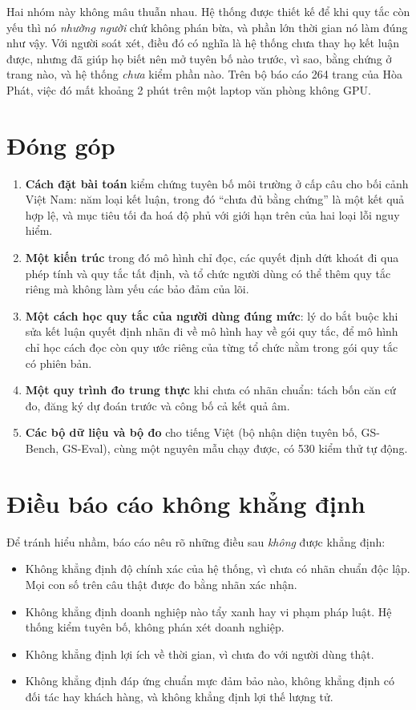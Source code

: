 Hai nhóm này không mâu thuẫn nhau. Hệ thống được thiết kế để khi quy tắc còn yếu thì nó \emph{nhường người} chứ không phán bừa, và phần lớn thời gian nó làm đúng như vậy. Với người soát xét, điều đó có nghĩa là hệ thống chưa thay họ kết luận được, nhưng đã giúp họ biết nên mở tuyên bố nào trước, vì sao, bằng chứng ở trang nào, và hệ thống \emph{chưa} kiểm phần nào. Trên bộ báo cáo 264 trang của Hòa Phát, việc đó mất khoảng 2 phút trên một laptop văn phòng không GPU.

\section{Đóng góp}

\begin{enumerate}
\item \textbf{Cách đặt bài toán} kiểm chứng tuyên bố môi trường ở cấp câu cho bối cảnh Việt Nam: năm loại kết luận, trong đó “chưa đủ bằng chứng” là một kết quả hợp lệ, và mục tiêu tối đa hoá độ phủ với giới hạn trên của hai loại lỗi nguy hiểm.
\item \textbf{Một kiến trúc} trong đó mô hình chỉ đọc, các quyết định dứt khoát đi qua phép tính và quy tắc tất định, và tổ chức người dùng có thể thêm quy tắc riêng mà không làm yếu các bảo đảm của lõi.
\item \textbf{Một cách học quy tắc của người dùng đúng mức}: lý do bắt buộc khi sửa kết luận quyết định nhãn đi về mô hình hay về gói quy tắc, để mô hình chỉ học cách đọc còn quy ước riêng của từng tổ chức nằm trong gói quy tắc có phiên bản.
\item \textbf{Một quy trình đo trung thực} khi chưa có nhãn chuẩn: tách bốn căn cứ đo, đăng ký dự đoán trước và công bố cả kết quả âm.
\item \textbf{Các bộ dữ liệu và bộ đo} cho tiếng Việt (bộ nhận diện tuyên bố, GS-Bench, GS-Eval), cùng một nguyên mẫu chạy được, có 530 kiểm thử tự động.
\end{enumerate}

\section{Điều báo cáo không khẳng định}

Để tránh hiểu nhầm, báo cáo nêu rõ những điều sau \emph{không} được khẳng định:
\begin{itemize}
\item Không khẳng định độ chính xác của hệ thống, vì chưa có nhãn chuẩn độc lập. Mọi con số trên câu thật được đo bằng nhãn xác nhận.
\item Không khẳng định doanh nghiệp nào tẩy xanh hay vi phạm pháp luật. Hệ thống kiểm tuyên bố, không phán xét doanh nghiệp.
\item Không khẳng định lợi ích về thời gian, vì chưa đo với người dùng thật.
\item Không khẳng định đáp ứng chuẩn mực đảm bảo nào, không khẳng định có đối tác hay khách hàng, và không khẳng định lợi thế lượng tử.
\end{itemize}

